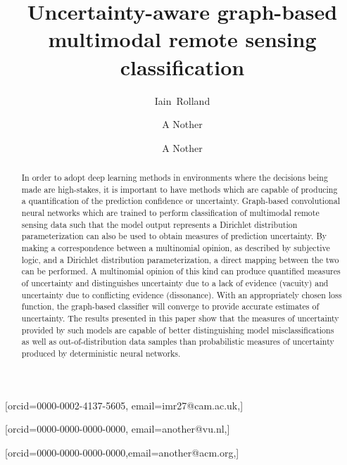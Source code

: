\documentclass[
twocolumn,
]{ceurart}
\begin{document}


\title{Uncertainty-aware graph-based multimodal remote sensing classification}

\author[1]{Iain~Rolland}[orcid=0000-0002-4137-5605, email=imr27@cam.ac.uk,]

\address[1]{Department of Engineering, University of Cambridge, Cambridge, CB2 1PZ United Kingdom}
\address[2]{Department of Physics and Technology, UiT the Arctic University of Norway, P.O. box 6050 Langnes, NO-9037, Tromsø, Norway}

\author[1]{A Nother}[orcid=0000-0000-0000-0000, email=another@vu.nl,]

\author[1]{A Nother}[orcid=0000-0000-0000-0000,email=another@acm.org,]

\begin{abstract}
In order to adopt deep learning methods in environments where the decisions being made are high-stakes, it is important to have methods which are capable of producing a quantification of the prediction confidence or uncertainty.
Graph-based convolutional neural networks which are trained to perform classification of multimodal remote sensing data such that the model output represents a Dirichlet distribution parameterization can also be used to obtain measures of prediction uncertainty.
By making a correspondence between a multinomial opinion, as described by subjective logic, and a Dirichlet distribution parameterization, a direct mapping between the two can be performed.
A multinomial opinion of this kind can produce quantified measures of uncertainty and distinguishes uncertainty due to a lack of evidence (vacuity) and uncertainty due to conflicting evidence (dissonance).
With an appropriately chosen loss function, the graph-based classifier will converge to provide accurate estimates of uncertainty.
The results presented in this paper show that the measures of uncertainty provided by such models are capable of better distinguishing model misclassifications as well as out-of-distribution data samples than probabilistic measures of uncertainty produced by deterministic neural networks.
\end{abstract}
\end{document}
